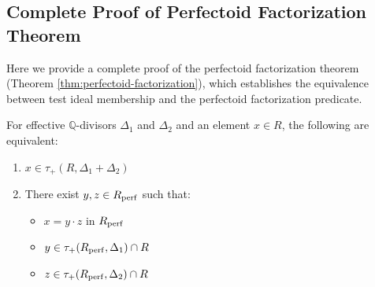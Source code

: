\subsection{Complete Proof of Perfectoid Factorization Theorem}

Here we provide a complete proof of the perfectoid factorization theorem (Theorem \ref{thm:perfectoid-factorization}), which establishes the equivalence between test ideal membership and the perfectoid factorization predicate.

\begin{theorem}\label{thm:perfectoid-factorization}
For effective $\mathbb{Q}$-divisors $\Delta_1$ and $\Delta_2$ and an element $x \in R$, the following are equivalent:
\begin{enumerate}
    \item $x \in \tau_+(R, \Delta_1 + \Delta_2)$
    \item There exist $y, z \in R_{\operatorname{perf}}$ such that:
    \begin{itemize}
        \item $x = y \cdot z$ in $R_{\operatorname{perf}}$
        \item $y \in \tau_+(R_{\operatorname{perf}}, \Delta_1) \cap R$
        \item $z \in \tau_+(R_{\operatorname{perf}}, \Delta_2) \cap R$
    \end{itemize}
\end{enumerate}
\end{theorem}

